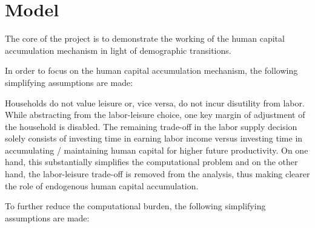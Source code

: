 \section{Model}
\label{sec:model}

The core of the project is to demonstrate the working of the human capital accumulation mechanism in light of demographic transitions.

In order to focus on the human capital accumulation mechanism, the following simplifying assumptions are made:

Households do not value leisure or, vice versa, do not incur disutility from labor. While abstracting from the labor-leisure choice, one key margin of adjustment of the household is disabled. The remaining trade-off in the labor supply decision solely consists of investing time in earning labor income versus investing time in accumulating / maintaining human capital for higher future productivity. On one hand, this substantially simplifies the computational problem and on the other hand, the labor-leisure trade-off is removed from the analysis, thus making clearer the role of endogenous human capital accumulation.



To further reduce the computational burden, the following simplifying assumptions are made:
